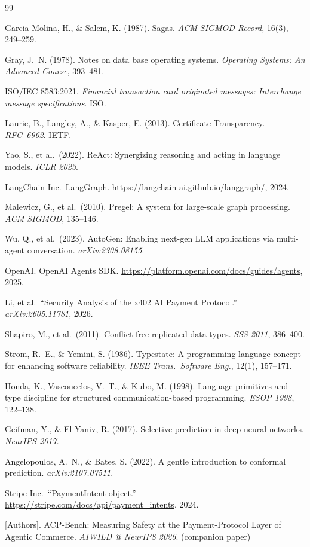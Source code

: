 \documentclass{article}
\begin{document}
\begin{thebibliography}{99}
\small

 Garcia-Molina, H., \& Salem, K. (1987). Sagas. \emph{ACM SIGMOD Record}, 16(3), 249--259.

\bibitem{2pc} Gray, J.\ N. (1978). Notes on data base operating systems. \emph{Operating Systems: An Advanced Course}, 393--481.

 ISO/IEC 8583:2021. \emph{Financial transaction card originated messages: Interchange message specifications}. ISO.

 Laurie, B., Langley, A., \& Kasper, E. (2013). Certificate Transparency. \emph{RFC~6962}. IETF.

 Yao, S., et al.\ (2022). ReAct: Synergizing reasoning and acting in language models. \emph{ICLR 2023}.

 LangChain Inc.\ LangGraph. \url{https://langchain-ai.github.io/langgraph/}, 2024.

 Malewicz, G., et al.\ (2010). Pregel: A system for large-scale graph processing. \emph{ACM SIGMOD}, 135--146.

 Wu, Q., et al.\ (2023). AutoGen: Enabling next-gen LLM applications via multi-agent conversation. \emph{arXiv:2308.08155}.

 OpenAI. OpenAI Agents SDK. \url{https://platform.openai.com/docs/guides/agents}, 2025.

 Li, et al.\ ``Security Analysis of the x402 AI Payment Protocol.'' \emph{arXiv:2605.11781}, 2026.

 Shapiro, M., et al.\ (2011). Conflict-free replicated data types. \emph{SSS 2011}, 386--400.

 Strom, R.\ E., \& Yemini, S. (1986). Typestate: A programming language concept for enhancing software reliability. \emph{IEEE Trans.\ Software Eng.}, 12(1), 157--171.

 Honda, K., Vasconcelos, V.\ T., \& Kubo, M. (1998). Language primitives and type discipline for structured communication-based programming. \emph{ESOP 1998}, 122--138.

 Geifman, Y., \& El-Yaniv, R. (2017). Selective prediction in deep neural networks. \emph{NeurIPS 2017}.

 Angelopoulos, A.\ N., \& Bates, S. (2022). A gentle introduction to conformal prediction. \emph{arXiv:2107.07511}.

 Stripe Inc.\ ``PaymentIntent object.'' \url{https://stripe.com/docs/api/payment_intents}, 2024.

 [Authors]. ACP-Bench: Measuring Safety at the Payment-Protocol Layer of Agentic Commerce. \emph{AIWILD @ NeurIPS 2026}. (companion paper)


\end{thebibliography}
\end{document}
